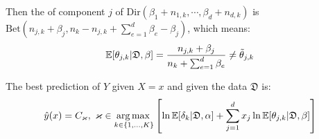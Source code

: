 Then the  of component $j$ of $\text{Dir}(\beta_1+n_{1,k},\cdots,\beta_d+n_{d,k})$ is $\text{Bet}(n_{j,k}+\beta_j, n_k-n_{j,k}+\sum_{e=1}^d\beta_e-\beta_j)$, which means:
\begin{equation*}
    \operatorname{\mathbb{E}} [\theta_{j,k}|\mathfrak{D},\beta] = \frac{n_{j,k}+\beta_j}{n_k+\sum_{e=1}^d\beta_e} \neq \Tilde{\theta}_{j,k}
\end{equation*}

The best prediction of $Y$ given $X=x$ and given the data $\mathfrak{D}$ is:
\begin{equation*}
    \hat{y}(x) = C_{\varkappa},\ \varkappa \in \operatorname*{arg\,max\,}_{k\in \{1,\dots,K\}} \left[ \ln\operatorname{\mathbb{E}} [\delta_k|\mathfrak{D},\alpha]+\sum_{j=1}^d x_j\ln \operatorname{\mathbb{E}} [\theta_{j,k}|\mathfrak{D},\beta] \right]
\end{equation*}